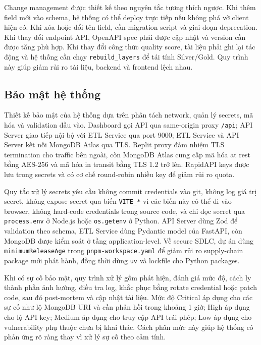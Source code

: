 \documentclass[12pt,a4paper]{article}
\begin{document}
Change management được thiết kế theo nguyên tắc tương thích ngược. Khi thêm field mới vào schema, hệ thống có thể deploy trực tiếp nếu không phá vỡ client hiện có. Khi xóa hoặc đổi tên field, cần migration script và giai đoạn deprecation. Khi thay đổi endpoint API, OpenAPI spec phải được cập nhật và version cần được tăng phù hợp. Khi thay đổi công thức quality score, tài liệu phải ghi lại tác động và hệ thống cần chạy \texttt{rebuild\_layers} để tái tính Silver/Gold. Quy trình này giúp giảm rủi ro tài liệu, backend và frontend lệch nhau.

\subsection{Bảo mật hệ thống}

Thiết kế bảo mật của hệ thống dựa trên phân tách network, quản lý secrets, mã hóa và validation đầu vào. Dashboard gọi API qua same-origin proxy \texttt{/api}; API Server giao tiếp nội bộ với ETL Service qua port 9000; ETL Service và API Server kết nối MongoDB Atlas qua TLS. Replit proxy đảm nhiệm TLS termination cho traffic bên ngoài, còn MongoDB Atlas cung cấp mã hóa at rest bằng AES-256 và mã hóa in transit bằng TLS 1.2 trở lên. RapidAPI keys được lưu trong secrets và có cơ chế round-robin nhiều key để giảm rủi ro quota.

Quy tắc xử lý secrets yêu cầu không commit credentials vào git, không log giá trị secret, không expose secret qua biến \texttt{VITE\_*} vì các biến này có thể đi vào browser, không hard-code credentials trong source code, và chỉ đọc secret qua \texttt{process.env} ở Node.js hoặc \texttt{os.getenv} ở Python. API Server dùng Zod để validation theo schema, ETL Service dùng Pydantic model của FastAPI, còn MongoDB được kiểm soát ở tầng application-level. Về secure SDLC, dự án dùng \texttt{minimumReleaseAge} trong \texttt{pnpm-workspace.yaml} để giảm rủi ro supply-chain package mới phát hành, đồng thời dùng \texttt{uv} và lockfile cho Python packages.

Khi có sự cố bảo mật, quy trình xử lý gồm phát hiện, đánh giá mức độ, cách ly thành phần ảnh hưởng, điều tra log, khắc phục bằng rotate credential hoặc patch code, sau đó post-mortem và cập nhật tài liệu. Mức độ Critical áp dụng cho các sự cố như lộ MongoDB URI và cần phản hồi trong khoảng 1 giờ; High áp dụng cho lộ API key; Medium áp dụng cho truy cập API trái phép; Low áp dụng cho vulnerability phụ thuộc chưa bị khai thác. Cách phân mức này giúp hệ thống có phản ứng rõ ràng thay vì xử lý sự cố theo cảm tính.
\end{document}
